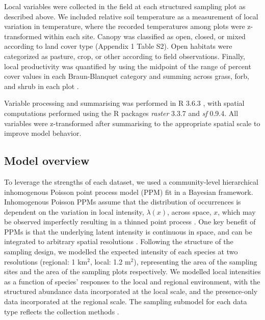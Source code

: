 \documentclass[preprint,review,times,12pt,3p]{elsarticle}
\begin{document}
Local variables were collected in the field at each structured sampling plot as described above. We included relative soil temperature as a measurement of local variation in temperature, where the recorded temperatures among plots were z-transformed within each site. Canopy was classified as open, closed, or mixed according to land cover type (Appendix 1 Table S2). Open habitats were categorized as pasture, crop, or other according to field observations. Finally, local productivity was quantified by using the midpoint of the range of percent cover values in each Braun-Blanquet category and summing across grass, forb, and shrub in each plot \citep{Douglas1978,Mccain2018,Szewczyk2018}.

Variable processing and summarising was performed in R 3.6.3 \citep{R-3-6-3}, with spatial computations performed using the R packages \emph{raster} 3.3.7 and \emph{sf} 0.9.4. All variables were z-transformed after summarising to the appropriate spatial scale to improve model behavior.


\subsection{Model overview}
To leverage the strengths of each dataset, we used a community-level hierarchical inhomogenous Poisson point process model (PPM) fit in a Bayesian framework. Inhomogenous Poisson PPMs assume that the distribution of occurrences is dependent on the variation in local intensity, $\lambda(x)$, across space, $x$, which may be observed imperfectly resulting in a thinned point process \citep{Warton2010,Baddeley2015,Fithian2015}. One key benefit of PPMs is that the underlying latent intensity is continuous in space, and can be integrated to arbitrary spatial resolutions \citep{Renner2015,Hefley2016,Koshkina2017a,Fletcher2019}. Following the structure of the sampling design, we modelled the expected intensity of each species at two resolutions (regional: 1 km$^2$, local: 1.2 m$^2$), representing the area of the sampling sites and the area of the sampling plots respectively. We modelled local intensities as a function of species' responses to the local and regional environment, with the structured abundance data incorporated at the local scale, and the presence-only data incorporated at the regional scale. The sampling submodel for each data type reflects the collection methods \citep{Isaac2014,Hefley2016,Fletcher2019,Miller2019}.
\end{document}

